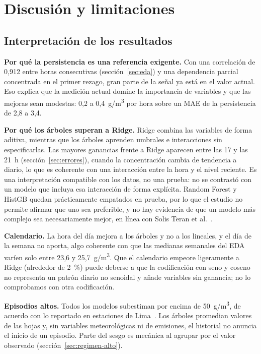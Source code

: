 \section{Discusión y limitaciones}
\label{sec:discusion}

\subsection{Interpretación de los resultados}
\textbf{Por qué la persistencia es una referencia exigente.} Con una correlación de 0,912 entre horas consecutivas (sección~\ref{sec:eda}) y una dependencia parcial concentrada en el primer rezago, gran parte de la señal ya está en el valor actual. Eso explica que la medición actual domine la importancia de variables y que las mejoras sean modestas: 0,2 a 0,4~\textmu g/m\textsuperscript{3} por hora sobre un MAE de la persistencia de 2,8 a 3,4.

\textbf{Por qué los árboles superan a Ridge.} Ridge combina las variables de forma aditiva, mientras que los árboles aprenden umbrales e interacciones sin especificarlas. Las mayores ganancias frente a Ridge aparecen entre las 17 y las 21~h (sección~\ref{sec:errores}), cuando la concentración cambia de tendencia a diario, lo que es coherente con una interacción entre la hora y el nivel reciente. Es una interpretación compatible con los datos, no una prueba: no se contrastó con un modelo que incluya esa interacción de forma explícita. Random Forest y HistGB quedan prácticamente empatados en prueba, por lo que el estudio no permite afirmar que uno sea preferible, y no hay evidencia de que un modelo más complejo sea necesariamente mejor, en línea con Solis Teran et al.~\cite{solis2025}.

\textbf{Calendario.} La hora del día mejora a los árboles y no a los lineales, y el día de la semana no aporta, algo coherente con que las medianas semanales del EDA varíen solo entre 23,6 y 25,7~\textmu g/m\textsuperscript{3}. Que el calendario empeore ligeramente a Ridge (alrededor de 2~\%) puede deberse a que la codificación con seno y coseno no representa un patrón diario no senoidal y añade variables sin ganancia; no lo comprobamos con otra codificación.

\textbf{Episodios altos.} Todos los modelos subestiman por encima de 50~\textmu g/m\textsuperscript{3}, de acuerdo con lo reportado en estaciones de Lima~\cite{hoyos2021}. Los árboles promedian valores de las hojas y, sin variables meteorológicas ni de emisiones, el historial no anuncia el inicio de un episodio. Parte del sesgo es mecánica al agrupar por el valor observado (sección~\ref{sec:regimen-alto}).

